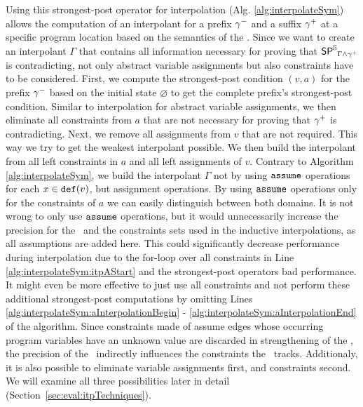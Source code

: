 Using this strongest-post operator for interpolation (Alg. \ref{alg:interpolateSym}) allows the computation of an interpolant for a prefix ${\gamma^{-}}$ and a suffix ${\gamma^{+}}$ at a specific program location based on the semantics of the \symbolicExecutionCPA.
Since we want to create an interpolant $\Gamma$ that contains all information necessary for proving that $\operatorname{\operatorname{\operatorname{\mathsf{SP}}}^{\mathbb{S}}}_{\Gamma \wedge {\gamma^{+}}}$ is contradicting, not only abstract variable assignments but also constraints have to be considered.
First, we compute the strongest-post condition $(v, a)$ for the prefix ${\gamma^{-}}$ based on the initial state $\varnothing$ to get the complete prefix's strongest-post condition.
Similar to interpolation for abstract variable assignments, we then eliminate all constraints from $a$ that are not necessary for proving that ${\gamma^{+}}$ is contradicting.
Next, we remove all assignments from $v$ that are not required. This way we try to get the weakest interpolant possible.
We then build the interpolant from all left constraints in $a$ and all left assignments of $v$.
Contrary to Algorithm \ref{alg:interpolateSym}, we build the interpolant $\Gamma$ not by using $\texttt{assume}$ operations for each $x \in \texttt{def}(v)$, but assignment operations.
By using $\texttt{assume}$ operations only for the constraints of $a$ we can easily distinguish between both domains.
It is not wrong to only use $\texttt{assume}$ operations, but it would unnecessarily increase the precision for the \constraintsCPA\ and the constraints sets used in the inductive interpolations, as all assumptions are added here.
This could significantly decrease performance during interpolation due to the for-loop over all constraints in Line \ref{alg:interpolateSym:itpAStart} and the strongest-post operators bad performance.
It might even be more effective to just use all constraints and not perform these additional strongest-post computations
by omitting Lines \ref{alg:interpolateSym:aInterpolationBegin} - \ref{alg:interpolateSym:aInterpolationEnd} of the algorithm.
Since constraints made of assume edges whose occurring program variables have an unknown value are discarded in strengthening of the \constraintsCPA, the precision of the \ indirectly influences the constraints the \constraintsCPA\ tracks.
Additionaly, it is also possible to eliminate variable assignments first, and constraints second.
We will examine all three possibilities later in detail (Section~\ref{sec:eval:itpTechniques}). 

